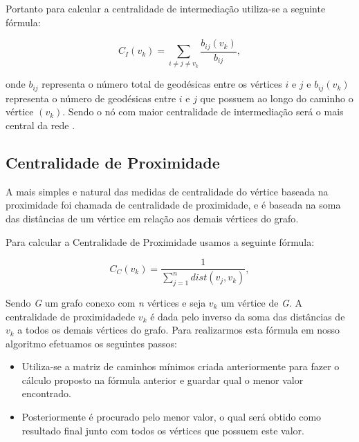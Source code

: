 \documentclass[12pt]{article}
\begin{document}
Portanto para calcular a centralidade de intermediação utiliza-se a seguinte fórmula: 
\begin{center}
\begin{equation}
C_I(v_k)=\sum_{i\neq j \neq v_{k}} \frac{b_{ij}(v_k)}{b_{ij}},
\end{equation}
\end{center}
onde $b_{ij}$ representa o número total de geodésicas entre os vértices $i$ e $j$ e  $b_{ij}(v_k)$ representa o número de geodésicas entre $i$ e $j$ que possuem ao longo do caminho o vértice $(v_k)$.
Sendo o nó com maior centralidade de intermediação será o mais central da rede \cite{ufimtsev} \cite{freeman}.

\subsection{Centralidade de Proximidade}
A mais simples e natural das medidas de centralidade do vértice baseada na proximidade foi chamada de centralidade de proximidade, e é baseada na soma das distâncias de um  vértice em relação aos demais vértices do grafo\cite{freitas}.

Para calcular a Centralidade de Proximidade usamos a seguinte fórmula:
\begin{center}
\begin{equation}
C_C(v_k)=\frac{1}{\sum\limits_{j = 1}^n dist(v_j,v_k)},
\end{equation}
\end{center}
Sendo {\it G} um grafo conexo com {\it n} vértices e seja $v_k$ um vértice de {\it G}. A centralidade de proximidadede $v_k$ é dada pelo inverso da soma das distâncias de $v_k$ a todos os demais vértices do grafo.
    Para realizarmos esta fórmula em nosso algoritmo efetuamos os seguintes passos:
\begin{itemize}
\item Utiliza-se a matriz de caminhos mínimos criada anteriormente para fazer o cálculo proposto na fórmula anterior e guardar qual o menor valor encontrado.
\item Posteriormente é procurado pelo menor valor, o qual será obtido como resultado final junto com todos os vértices que possuem este valor.
\end{itemize}
\end{document}
